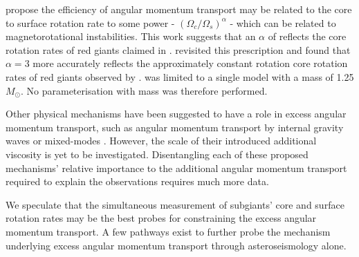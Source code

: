 \citet{spada_angular_2016} propose the efficiency of angular momentum transport may be related to the core to surface rotation rate to some power - $\left(\Omega_c/\Omega_s\right)^{\alpha}$ - which can be related to magnetorotational instabilities.
This work suggests that an $\alpha$ of reflects the core rotation rates of red giants claimed in \citet{mosser_spin_2012}.
\citet{moyano_asteroseismology_2022} revisited this prescription and found that $\alpha = 3$ more accurately reflects the approximately constant rotation core rotation rates of red giants observed by \citet{gehan_core_2018}.
\citet{spada_angular_2016} was limited to a single model with a mass of 1.25 $M_{\odot}$.
No parameterisation with mass was therefore performed.

Other physical mechanisms have been suggested to have a role in excess angular momentum transport, such as angular momentum transport by internal gravity waves \citep{pincon_can_2017} or mixed-modes \citep{belkacem_angular_2015}. 
However, the scale of their introduced additional viscosity is yet to be investigated.
Disentangling each of these proposed mechanisms' relative importance to the additional angular momentum transport required to explain the observations requires much more data.



We speculate that the simultaneous measurement of subgiants' core and surface rotation rates may be the best probes for constraining the excess angular momentum transport.
A few pathways exist to further probe the mechanism underlying excess angular momentum transport through asteroseismology alone.

